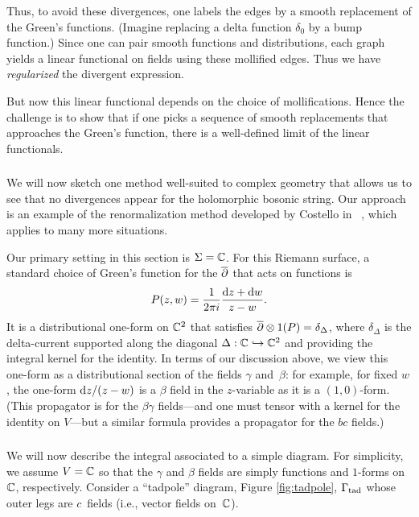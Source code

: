 Thus, to avoid these divergences, one labels the edges by a smooth replacement of the Green's functions. 
(Imagine replacing a delta function $\delta_0$ by a bump function.)
Since one can pair smooth functions and distributions,
each graph yields a linear functional on fields using these mollified edges.
Thus we have {\em regularized} the divergent expression.

But now this linear functional depends on the choice of mollifications.
Hence the challenge is to show that 
if one picks a sequence of smooth replacements that approaches the Green's function,
there is a well-defined limit of the linear functionals.

\subsubsection{}

We will now sketch one method well-suited to complex geometry
that allows us to see that no divergences appear for the holomorphic bosonic string.
Our approach is an example of the renormalization method developed by Costello in ~\cite{CosBook},
which applies to many more situations.

Our primary setting in this section is $\Sigma=\mathbb C$.
For this Riemann surface, 
a standard choice of Green's function for the $\overline{\partial}$ that acts on functions is
\[
P(z,w) = \frac{1}{2 \pi i} \frac{{\rm d} z + {\rm d} w}{z-w}.
\]
It is a distributional one-form on $\mathbb C^2$ that satisfies $\overline{\partial} \otimes 1(P) = \delta_\Delta$, 
where $\delta_\Delta$ is the delta-current supported along the diagonal $\Delta: \mathbb C \hookrightarrow \mathbb C^2$ and providing the integral kernel for the identity.
In terms of our discussion above,
we view this one-form as a distributional section of the fields $\gamma$ and~$\beta$: 
for example, for fixed $w$, the one-form ${\rm d} z/(z - w)$ is a $\beta$ field in the $z$-variable 
as it is a $(1,0)$-form.
(This propagator is for the $\beta\gamma$ fields---and one must tensor with a kernel for the identity on $V$---but a similar formula provides a propagator for the $bc$ fields.)

\subsubsection{}

We will now describe the integral associated to a simple diagram.
For simplicity, we assume $V = \mathbb C$ so that the $\gamma$ and $\beta$ fields are simply functions and $1$-forms on $\mathbb C$, respectively.
Consider a ``tadpole'' diagram, Figure \ref{fig:tadpole}, $\Gamma_{\rm tad}$ whose outer legs are $c$~fields 
(i.e., vector fields on~$\mathbb C$).


